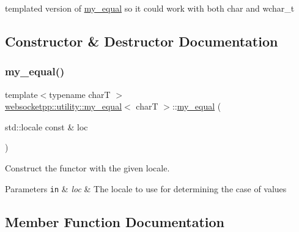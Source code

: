 templated version of \mbox{\hyperlink{structwebsocketpp_1_1utility_1_1my__equal}{my\+\_\+equal}} so it could work with both char and wchar\+\_\+t 

\subsection{Constructor \& Destructor Documentation}
\mbox{\label{structwebsocketpp_1_1utility_1_1my__equal_a8f03de886784304ffd39ed5de677af1f}} 
\subsubsection{\texorpdfstring{my\+\_\+equal()}{my\_equal()}}
{\footnotesize\ttfamily template$<$typename charT $>$ \\
\mbox{\hyperlink{structwebsocketpp_1_1utility_1_1my__equal}{websocketpp\+::utility\+::my\+\_\+equal}}$<$ charT $>$\+::\mbox{\hyperlink{structwebsocketpp_1_1utility_1_1my__equal}{my\+\_\+equal}} (\begin{DoxyParamCaption}\item[{std\+::locale const \&}]{loc }\end{DoxyParamCaption})\hspace{0.3cm}{\ttfamily [inline]}}



Construct the functor with the given locale. 


\begin{DoxyParams}[1]{Parameters}
\mbox{\tt in}  & {\em loc} & The locale to use for determining the case of values \\
\hline
\end{DoxyParams}


\subsection{Member Function Documentation}
\mbox{\label{structwebsocketpp_1_1utility_1_1my__equal_a06b93db62003458703574e6421f9875f}} 
